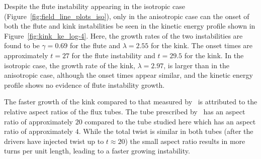 \documentclass[fleqn,usenatbib]{mnras}
\newcommand{\revcite}[1]{{\color{red} \underline{#1}}}
\begin{document}
Despite the flute instability appearing in the isotropic case
(Figure~\ref{fig:field_line_plots_iso}), only in the anisotropic case can the
onset of both the flute and kink instabilities be seen in the kinetic energy
profile shown in Figure~\ref{fig:kink_ke_log-4}. Here, the growth
rates of the two instabilities are found to be $\gamma = 0.69$ for the flute
and $\lambda = 2.55$ for the kink. The onset times are approximately $t=27$ for
the flute instability and $t=29.5$ for the kink. In the isotropic case, the
growth rate of the kink, $\lambda = 2.97$, is larger than in the anisotropic
case, although the onset times appear similar, and the kinetic energy profile
shows no evidence of flute instability growth. 

The faster growth of the kink compared to that measured by~\revcite{\citet{quinnEffectAnisotropicViscosity2020}} is attributed to the relative
aspect ratios of the flux tubes. The tube prescribed by~\revcite{\citet{quinnEffectAnisotropicViscosity2020}} has an aspect ratio of
approximately $20$ compared to the tube studied here which has an aspect ratio
of approximately $4$. While the total twist is similar in both tubes (after the
drivers have injected twist up to $t\approx20$) the small aspect ratio results
in more turns per unit length, leading to a faster growing instability. 
\end{document}
